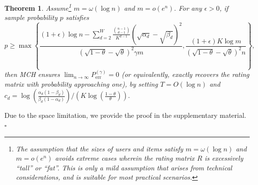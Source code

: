 \documentclass{article}
\newtheorem{theorem}{Theorem}
\newtheorem{remark}{Remark}
\newenvironment{proof}{{\noindent\it Proof:}\quad}{\hfill $\square$\par}
\begin{document}
\begin{theorem}\label{The1}
    Assume\footnote{The assumption that the sizes of users and items satisfy $m=\omega(\log n)$ and $m = o(e^n)$ avoids extreme cases wherein the rating matrix $R$ is excessively ``tall'' or ``fat''. This is only a mild assumption that arises from technical considerations, and is suitable for most practical scenarios.} $m=\omega(\log n)$ and $m=o(e^n)$. For any $\epsilon>0$, if sample probability $p$ satisfies
    \begin{equation}\label{eq3}
        p \geq \max \left\{ \frac{(1+\epsilon)\log n - \sum_{d=2}^{W} \frac{\binom{n-1}{d-1}}{K^{d-1}} (\sqrt{\alpha_d}-\sqrt{\beta_d})^2}{(\sqrt{1-\theta} - \sqrt{\theta})^2 \gamma m}, \frac{ (1+\epsilon) K \log m}{(\sqrt{1-\theta} - \sqrt{\theta})^2 n} \right\}, 
    \end{equation}
    then MCH ensures $\lim_{n \rightarrow \infty}P_{\mathrm{err}}^{(\gamma)} = 0$ (or equivalently, exactly recovers the rating matrix with probability approaching one), by setting $T = O(\log n)$ and $c_d =  \log \left( \frac{\alpha_d(1-\beta_d)}{\beta_d(1-\alpha_d)} \right) / \left( K \log \left( \frac{1-\theta}{\theta} \right) \right).$

    
\end{theorem}

\begin{proof}
    Due to the space limitation, we provide the proof in the supplementary material.
\end{proof}

\end{document}
